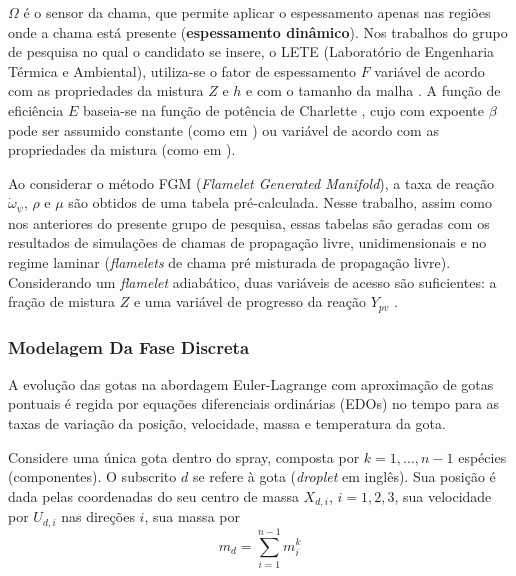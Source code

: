 $\Omega$ é o sensor da chama, que permite aplicar o espessamento apenas nas regiões onde a chama está presente (\textbf{espessamento dinâmico}).
Nos trabalhos do grupo de pesquisa no qual o candidato se insere, o LETE (Laboratório de Engenharia Térmica e Ambiental), utiliza-se o fator de espessamento $F$ variável de acordo com as propriedades da mistura $Z$ e $h$ e com o tamanho da malha \cite{SacomanoF2017PhD,SacomanoF2017CF}.
A função de eficiência $E$ baseia-se na função de potência de Charlette \cite{CharletteF2002}, cujo com expoente $\beta$ pode ser assumido constante (como em \cite{SacomanoF2017PhD,SacomanoF2017CF,SacomanoF2019IJHMT,ShastryV2023,SekularacN2024}) ou variável de acordo com as propriedades da mistura (como em \cite{SacomanoF2020CF}).

Ao considerar o método FGM (\emph{Flamelet Generated Manifold}), a taxa de reação $\dot \omega_\psi$, $\rho$ e $\mu$ são obtidos de uma tabela pré-calculada.
Nesse trabalho, assim como nos anteriores do presente grupo de pesquisa, essas tabelas são geradas com os resultados de simulações de chamas de propagação livre, unidimensionais e no regime laminar (\emph{flamelets} de chama pré misturada de propagação livre).
Considerando um \emph{flamelet} adiabático, duas variáveis de acesso são suficientes: a fração de mistura $Z$ e uma variável de progresso da reação $Y_{pv}$ \cite{PoinsotVeynante2005}.
    

\subsubsection{Modelagem Da Fase Discreta} \label{sec:gotas}

A evolução das gotas na abordagem Euler-Lagrange com aproximação de gotas pontuais é regida por equações diferenciais ordinárias (EDOs) no tempo para as taxas de variação da posição, velocidade, massa e temperatura da gota.

Considere uma única gota dentro do spray, composta por $k=1,\ldots,n-1$ espécies (componentes).
O subscrito $d$ se refere à gota (\emph{droplet} em inglês).
Sua posição é dada pelas coordenadas do seu centro de massa $X_{d,i}$, $i=1,2,3$, sua velocidade por $U_{d,i}$ nas direções $i$, sua massa por 
\vspace{-6pt}
\begin{equation}    
    m_d = \sum_{i=1}^{n-1} m_{i}^k
\end{equation} 
\vspace{-24pt}

